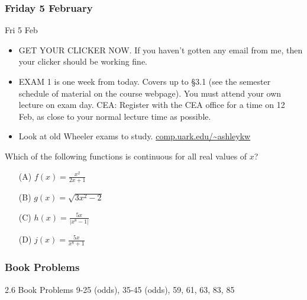 \documentclass[cal1spr16Lectures.tex]{subfiles}
\begin{document}

\subsubsection{\bf Friday 5 February}
\begin{frame}[allowframebreaks]{Fri 5 Feb}
\begin{itemize}%
\item GET YOUR CLICKER NOW.  If you haven't gotten any email from me, then your clicker should be working fine.  	
\item EXAM 1 is one week from today.  Covers up to \S 3.1 (see the semester schedule of material on the course webpage).  \alert{You must attend your own lecture on exam day.}  CEA: Register with the CEA office for a time on 12 Feb, as close to your normal lecture time as possible.
\item Look at old Wheeler exams to study.
\url{comp.uark.edu/~ashleykw}
\end{itemize}
\end{frame}

\begin{frame}
\begin{exe} Which of the following functions is continuous for all real values of $x$?
\begin{itemize}
\item[(A)\;] $f(x)=\frac{x^2}{2x+1}$
\item[(B)\;] $g(x)=\sqrt{3x^2-2}$
\item[(C)\;] $h(x)=\frac{5x}{|x^8-1|}$
\item[(D)\;] $j(x)=\frac{5x}{x^8+1}$
\end{itemize}
\end{exe}
\end{frame}

\subsubsection{Book Problems}
\begin{frame}
\begin{block}{2.6 Book Problems} 9-25 (odds), 35-45 (odds), 59, 61, 63, 83, 85 \end{block} 
\end{frame}

\end{document}
